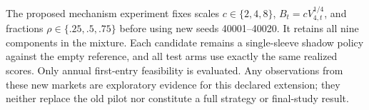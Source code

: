 The proposed mechanism experiment fixes scales $c\in\{2,4,8\}$,
$B_t=cV_{4,t}^{1/4}$, and fractions $\rho\in\{.25,.5,.75\}$ before
using new seeds 40001--40020. It retains all nine components in the mixture.
Each candidate remains a single-sleeve shadow policy against the empty
reference, and all test arms use exactly the same realized scores. Only
annual first-entry feasibility is evaluated. Any observations from these new
markets are exploratory evidence for this declared extension; they neither
replace the old pilot nor constitute a full strategy or final-study result.


